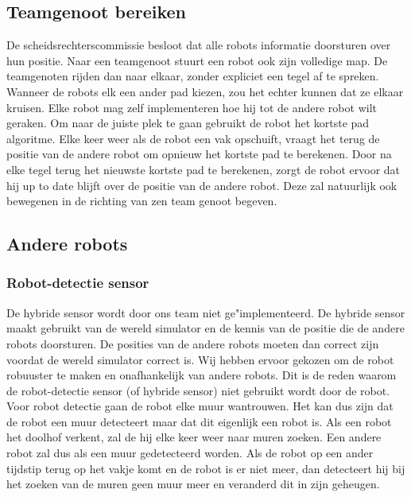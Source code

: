 \documentclass[tt3]{penoverslag}
\begin{document}
\subsection{Teamgenoot bereiken}
\label{ssec:AlgoAndereRobot}

De scheidsrechterscommissie besloot dat alle robots informatie doorsturen over hun positie. Naar een teamgenoot stuurt een robot ook zijn volledige map. De teamgenoten rijden dan naar elkaar, zonder expliciet een tegel af te spreken. Wanneer de robots elk een ander pad kiezen, zou het echter kunnen dat ze elkaar kruisen. Elke robot mag zelf implementeren hoe hij tot de andere robot wilt geraken.
Om naar de juiste plek te gaan gebruikt de robot het kortste pad algoritme. Elke keer weer als de robot een vak opschuift, vraagt het terug de positie van de andere robot om opnieuw het kortste pad te berekenen. Door na elke tegel terug het nieuwste kortste pad te berekenen, zorgt de robot ervoor dat hij up to date blijft over de positie van de andere robot. Deze zal natuurlijk ook bewegenen in de richting van zen team genoot begeven.

\subsection{Andere robots}
\subsubsection{Robot-detectie sensor}
\label{ssec:AlgoCollision}

De hybride sensor wordt door ons team niet ge"implementeerd. De hybride sensor maakt gebruikt van de wereld simulator en de kennis van de positie die de andere robots doorsturen. De posities van de andere robots moeten dan correct zijn voordat de wereld simulator correct is. Wij hebben ervoor gekozen om de robot robuuster te maken en onafhankelijk van andere robots. Dit is de reden waarom de robot-detectie sensor (of hybride sensor) niet gebruikt wordt door de robot. Voor robot detectie gaan de robot elke muur wantrouwen. Het kan dus zijn dat de robot een muur detecteert maar dat dit eigenlijk een robot is. Als een robot het doolhof verkent, zal de hij elke keer weer naar muren zoeken. Een andere robot zal dus als een muur gedetecteerd worden. Als de robot op een ander tijdstip terug op het vakje komt en de robot is er niet meer, dan detecteert hij bij het zoeken van de muren geen muur meer en veranderd dit in zijn geheugen. 
\end{document}
